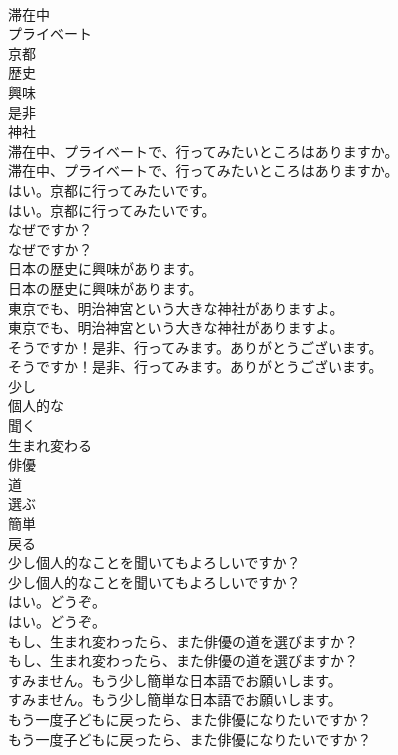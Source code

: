 \documentclass[8pt]{extreport}
\begin{document}
\begin{CJK}{UTF8}{min}
\\	滞在中
\\	プライベート
\\	京都
\\	歴史
\\	興味
\\	是非
\\	神社
\\	滞在中、プライベートで、行ってみたいところはありますか。	
\\	滞在中、プライベートで、行ってみたいところはありますか。 
\\	はい。京都に行ってみたいです。	
\\	はい。京都に行ってみたいです。 
\\	なぜですか？	
\\	なぜですか？ 
\\	日本の歴史に興味があります。	
\\	日本の歴史に興味があります。 
\\	東京でも、明治神宮という大きな神社がありますよ。	
\\	東京でも、明治神宮という大きな神社がありますよ。 
\\	そうですか！是非、行ってみます。ありがとうございます。	
\\	そうですか！是非、行ってみます。ありがとうございます。 
\\	少し
\\	個人的な
\\	聞く
\\	生まれ変わる
\\	俳優
\\	道
\\	選ぶ
\\	簡単
\\	戻る
\\	少し個人的なことを聞いてもよろしいですか？	
\\	少し個人的なことを聞いてもよろしいですか？ 
\\	はい。どうぞ。	
\\	はい。どうぞ。 
\\	もし、生まれ変わったら、また俳優の道を選びますか？	
\\	もし、生まれ変わったら、また俳優の道を選びますか？ 
\\	すみません。もう少し簡単な日本語でお願いします。	
\\	すみません。もう少し簡単な日本語でお願いします。 
\\	もう一度子どもに戻ったら、また俳優になりたいですか？	
\\	もう一度子どもに戻ったら、また俳優になりたいですか？ 

\end{CJK}
\end{document}
